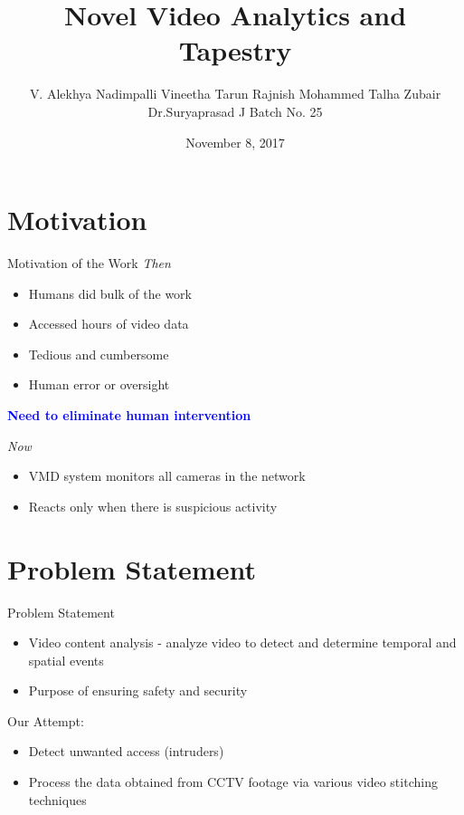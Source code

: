 \documentclass{beamer}
\title[NVAT]{Novel Video Analytics and Tapestry}
\author[]{
  V. Alekhya
\newline
  Nadimpalli Vineetha
\newline
  Tarun Rajnish
\newline	
  Mohammed Talha Zubair
\newline
\newline
\small{
  Dr.Suryaprasad J
\newline  Batch No. 25}}
\institute[25]{}
\date[November 8, 2017]{November 8, 2017}
\begin{document}

\begin{frame}
  \titlepage 
\end{frame}


\section{Motivation}
\begin{frame}{Motivation of the Work}
  \textit{\large{Then}}
  \begin{itemize}
    \item Humans did bulk of the work
    \item Accessed hours of video data
    \item Tedious and cumbersome
    \item Human error or oversight
  \end{itemize} 
  \begin{center}
    \textbf{\textcolor{blue}{\Large{Need to eliminate human intervention}}}
  \end{center}
  \textit{\large{Now}}
  \begin{itemize}
    \item VMD system monitors all cameras in the network
    \item Reacts only when there is suspicious activity
  \end{itemize}    	
\end{frame}


\section{Problem Statement}
\begin{frame}{Problem Statement}
  \begin{itemize}
    \item Video content analysis - analyze video to detect and determine temporal and spatial events
    \item Purpose of ensuring safety and security
  \end{itemize}
  Our Attempt:
  \begin{itemize}
    \item Detect unwanted access (intruders)
    \item Process the data obtained from CCTV footage via various video stitching techniques 
  \end{itemize}
\end{frame}
\end{document}
